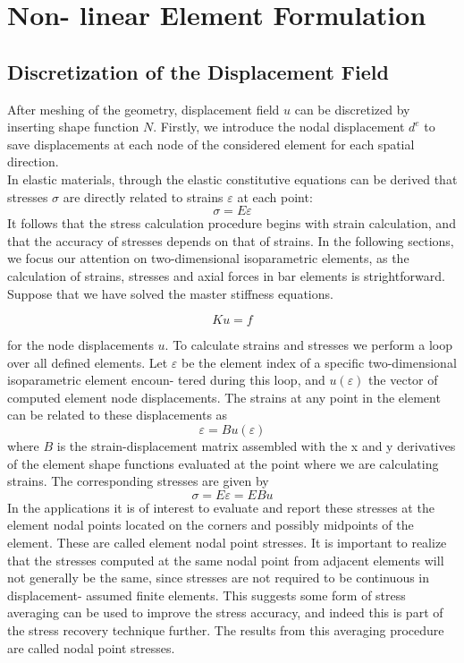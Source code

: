\section{Non- linear Element Formulation}
\subsection{Discretization of the Displacement Field}
After meshing of the geometry, displacement field $u$ can be discretized by inserting shape function $N$. Firstly, we introduce the nodal displacement $d^e$ to save displacements at each node of the considered element for each spatial direction.
\begin{equation}

\end{equation}
In elastic materials, through the elastic constitutive equations can be derived that stresses $\sigma$ are directly related to strains $\varepsilon$ at each point:
\begin{equation}
\sigma = E\varepsilon
\end{equation}
It follows that the stress calculation procedure begins with strain calculation, and that the accuracy of stresses depends on that of strains. In the following sections, we focus our attention on two-dimensional isoparametric elements, as the calculation of strains, stresses and axial forces in bar elements is strightforward. Suppose that we have solved the master stiffness equations. 


	\begin{equation}
	Ku = f
	\end{equation}


for the node displacements $u$. To calculate strains and stresses we perform a loop over all defined elements. Let $\varepsilon$ be the element index of a specific two-dimensional isoparametric element encoun- tered during this loop, and $u(\varepsilon)$ the vector of computed element node displacements. The strains at any point in the element can be related to these displacements as 
\begin{equation}
\varepsilon = Bu(\varepsilon) 
\end{equation}
where $B$ is the strain-displacement matrix assembled with the x and y derivatives of the element shape functions evaluated at the point where we are calculating strains. The corresponding stresses are given by 
\begin{equation}
\sigma = E\varepsilon = EBu 
\end{equation}
In the applications it is of interest to evaluate and report these stresses at the element nodal points located on the corners and possibly midpoints of the element. These are called element nodal point stresses.
It is important to realize that the stresses computed at the same nodal point from adjacent elements will not generally be the same, since stresses are not required to be continuous in displacement- assumed finite elements. This suggests some form of stress averaging can be used to improve the stress accuracy, and indeed this is part of the stress recovery technique further. The results from this averaging procedure are called nodal point stresses.


